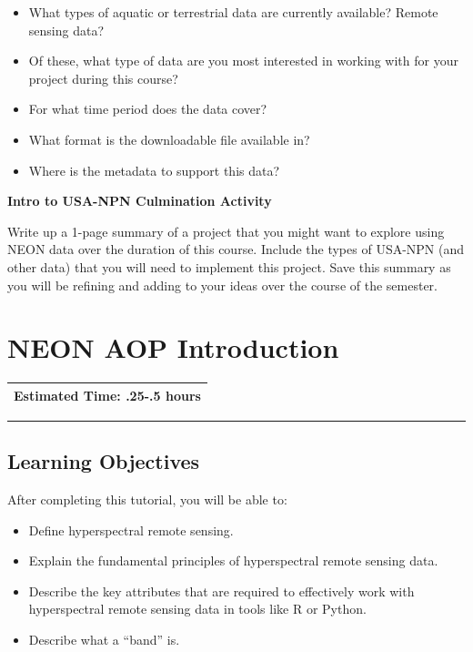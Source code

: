 \documentclass[]{book}
\providecommand{\tightlist}{%
  \setlength{\itemsep}{0pt}\setlength{\parskip}{0pt}}
\begin{document}
\begin{itemize}
\tightlist
\item
  What types of aquatic or terrestrial data are currently available? Remote sensing data?\\
\item
  Of these, what type of data are you most interested in working with for your project during this course?\\
\item
  For what time period does the data cover?\\
\item
  What format is the downloadable file available in?\\
\item
  Where is the metadata to support this data?\\
\end{itemize}

\textbf{Intro to USA-NPN Culmination Activity}

Write up a 1-page summary of a project that you might want to explore using NEON data over the duration of this course. Include the types of USA-NPN (and other data) that you will need to implement this project. Save this summary as you will be refining and adding to your ideas over the course of the semester.

\hypertarget{neon-aop-introduction}{%
\chapter{NEON AOP Introduction}\label{neon-aop-introduction}}

\begin{longtable}[]{@{}l@{}}
\toprule
\endhead
Estimated Time: .25-.5 hours\tabularnewline
\bottomrule
\end{longtable}

\hypertarget{ds-objectives}{}
\begin{center}\rule{0.5\linewidth}{0.5pt}\end{center}

\hypertarget{learning-objectives}{%
\section{Learning Objectives}\label{learning-objectives}}

After completing this tutorial, you will be able to:

\begin{itemize}
\tightlist
\item
  Define hyperspectral remote sensing.
\item
  Explain the fundamental principles of hyperspectral remote sensing data.
\item
  Describe the key attributes that are required to effectively work with
  hyperspectral remote sensing data in tools like R or Python.
\item
  Describe what a ``band'' is.
\end{itemize}
\end{document}
